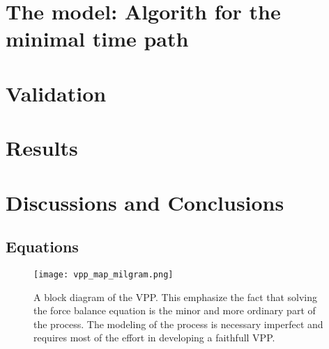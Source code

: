 \section{The model: Algorith for the minimal time path}
\section{Validation}
\section{Results}
\section{Discussions and Conclusions}
\appendix
\subsection{Equations } \label{forces_equations} %
\begin{figure}
\centering
  \texttt{[image: vpp\_map\_milgram.png]}
 \caption{A block diagram of the VPP. This emphasize the fact that solving the force balance equation is the minor and more ordinary part of the process. The modeling of the process is necessary imperfect and requires most of the effort in developing a faithfull VPP. \cite{milgram1998fluid} }
\label{vpp_diagram}
\end{figure}
\newpage

